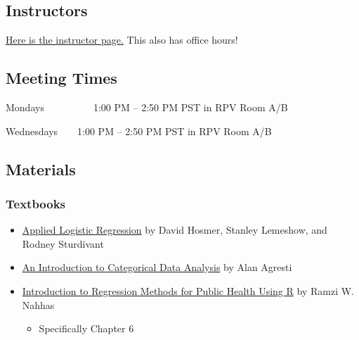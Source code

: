 \documentclass[
  letterpaper,
  DIV=11,
  numbers=noendperiod]{scrartcl}
\providecommand{\tightlist}{%
  \setlength{\itemsep}{0pt}\setlength{\parskip}{0pt}}\usepackage{longtable,booktabs,array}
\begin{document}
\hypertarget{instructors}{%
\subsection{Instructors}\label{instructors}}

\href{instructors.qmd}{Here is the instructor page.} This also has
office hours!

\hypertarget{meeting-times}{%
\subsection{Meeting Times}\label{meeting-times}}

Mondays~~~~~~~~~~1:00 PM -- 2:50 PM PST in RPV Room A/B

Wednesdays~~~~1:00 PM -- 2:50 PM PST in RPV Room A/B

\hypertarget{materials}{%
\subsection{Materials}\label{materials}}

\hypertarget{textbooks}{%
\subsubsection{Textbooks}\label{textbooks}}

\begin{itemize}
\item
  \href{https://ohsuitg-my.sharepoint.com/:b:/r/personal/wakim_ohsu_edu/Documents/Teaching/Classes/S2024_BSTA_513_613/Student_files/Textbooks/Hosmer_Applied_Logistic_Regression.pdf?csf=1\&web=1\&e=Ur29qk}{Applied
  Logistic Regression} by David Hosmer, Stanley Lemeshow, and Rodney
  Sturdivant
\item
  \href{https://ohsuitg-my.sharepoint.com/:b:/r/personal/wakim_ohsu_edu/Documents/Teaching/Classes/S2024_BSTA_513_613/Student_files/Textbooks/Agresti_Introduction_to_Categorical_Data.pdf?csf=1\&web=1\&e=WBwuuW}{An
  Introduction to Categorical Data Analysis} by Alan Agresti
\item
  \href{https://bookdown.org/rwnahhas/RMPH/}{Introduction to Regression
  Methods for Public Health Using R} by Ramzi W. Nahhas

  \begin{itemize}
  \tightlist
  \item
    Specifically Chapter 6
  \end{itemize}
\end{itemize}
\end{document}
